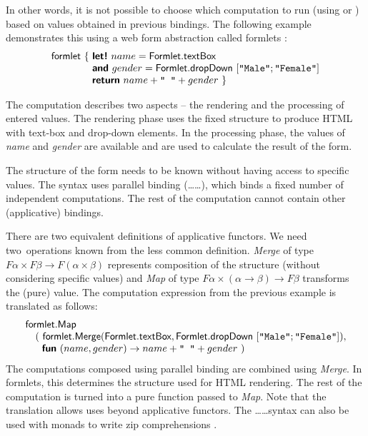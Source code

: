 \documentclass[runningheads,a4paper]{llncs}
\begin{document}
In other words, it is not possible to choose which computation to run (using  or 
) based on values obtained in previous  bindings. The following 
example demonstrates this using a web form abstraction called formlets \cite{formlets}:
%
\begin{equation*}
\begin{array}{l}
\ident{formlet}~\{~ \kvd{let!}~name = \ident{Formlet}.\ident{textBox} \\
\hspace{4.1em} \kvd{and}~gender = \ident{Formlet}.\ident{dropDown}~[\texttt{"Male"}; \texttt{"Female"}] \\
\hspace{4.1em} \kvd{return}~name + \texttt{" "} + gender ~\}
\end{array}
\end{equation*}

The computation describes two aspects -- the rendering and the processing of entered values.
The rendering phase uses the fixed structure to produce HTML with text-box and drop-down elements.
In the processing phase, the values of \emph{name} and \emph{gender} are available and are used to
calculate the result of the form.

The structure of the form needs to be known without having access to specific values. The syntax
uses parallel binding (\ldots{}\ldots), which binds a fixed number of independent
computations. The rest of the computation cannot contain other (applicative) bindings.

There are two equivalent definitions of applicative functors. We need two~operations known
from the less common definition. \emph{Merge} of type $F\alpha \times F\beta \rightarrow F(\alpha\times\beta)$
represents composition of the structure (without considering specific values) and \emph{Map} of 
type $F\alpha \times (\alpha \rightarrow \beta) \rightarrow F\beta$ transforms the (pure) value.
The computation expression from the previous example is translated as follows:
%
\vspace{-0.3em}
\begin{equation*}
\begin{array}{l}
\ident{formlet}.\ident{Map} \\
\quad (~\ident{formlet}.\ident{Merge}(\ident{Formlet}.\ident{textBox}, 
  \ident{Formlet}.\ident{dropDown}~[\texttt{"Male"}; \texttt{"Female"}]),  \\
\quad~~\kvd{fun}~(name, gender) \rightarrow name + \texttt{" "} + gender~)
\end{array}
\vspace{-0.3em}
\end{equation*}
%
The computations composed using parallel binding are combined using \emph{Merge}. In formlets, 
this determines the structure used for HTML rendering. The rest of the computation is turned into 
a pure function passed to \emph{Map}. Note that the translation allows uses beyond applicative 
functors. The \ldots{}\ldots syntax can also be used with monads to write 
zip comprehensions \cite{monad-compre}.
\end{document}
